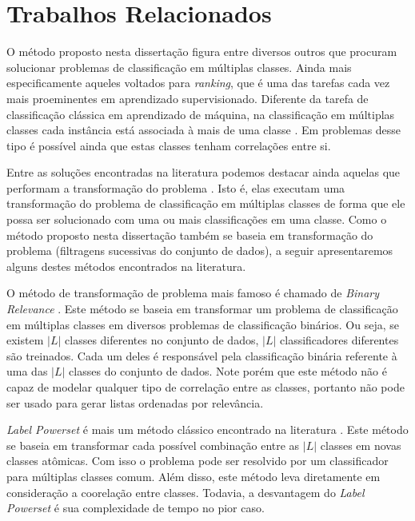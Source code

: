 \chapter{Trabalhos Relacionados}

O método proposto nesta dissertação figura entre diversos outros que procuram solucionar problemas de classificação em múltiplas classes.
Ainda mais especificamente aqueles voltados para \textit{ranking}, que é uma das tarefas cada vez mais proeminentes em aprendizado supervisionado.
Diferente da tarefa de classificação clássica em aprendizado de máquina, na classificação em múltiplas classes cada instância está associada à mais de uma classe \cite{Tsoumakas}.
Em problemas desse tipo é possível ainda que estas classes tenham correlações entre si.

Entre as soluções encontradas na literatura podemos destacar ainda aquelas que performam a transformação do problema \cite{Tsoumakas}.
Isto é, elas executam uma transformação do problema de classificação em múltiplas classes de forma que ele possa ser solucionado com uma ou mais classificações em uma classe.
Como o método proposto nesta dissertação também se baseia em transformação do problema (filtragens sucessivas do conjunto de dados), a seguir apresentaremos alguns destes métodos encontrados na literatura.

O método de transformação de problema mais famoso é chamado de \textit{Binary Relevance} \cite{Tsoumakas, Godbole, Zhang}.
Este método se baseia em transformar um problema de classificação em múltiplas classes em diversos problemas de classificação binários.
Ou seja, se existem $\vert L \vert$ classes diferentes no conjunto de dados, $\vert L \vert$ classificadores diferentes são treinados.
Cada um deles é responsável pela classificação binária referente à uma das $\vert L \vert$ classes do conjunto de dados.
Note porém que este método não é capaz de modelar qualquer tipo de correlação entre as classes, portanto não pode ser usado para gerar listas ordenadas por relevância.

\textit{Label Powerset} é mais um método clássico encontrado na literatura \cite{Tsoumakas02, Read02}.
Este método se baseia em transformar cada possível combinação entre as $\vert L \vert$ classes em novas classes atômicas.
Com isso o problema pode ser resolvido por um classificador para múltiplas classes comum.
Além disso, este método leva diretamente em consideração a coorelação entre classes.
Todavia, a desvantagem do \textit{Label Powerset} é sua complexidade de tempo no pior caso.

